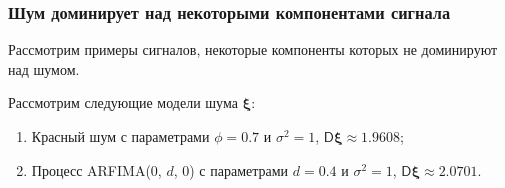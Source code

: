 \documentclass[specialist,
substylefile = spbu_report.rtx,
subf,12pt]{disser}
\theoremstyle{definition}
\begin{document}
\subsubsection{Шум доминирует над некоторыми компонентами сигнала}

Рассмотрим примеры сигналов, некоторые компоненты которых не доминируют над шумом.

Рассмотрим следующие модели шума $\bm\xi$:
\begin{enumerate}
	\item Красный шум с параметрами $\phi=0.7$ и $\sigma^2=1$, $\mathsf{D}\bm\xi\approx1.9608$;
	\item Процесс ARFIMA(0, $d$, 0) с параметрами $d=0.4$ и $\sigma^2=1$, $\mathsf{D}\bm\xi\approx2.0701$.
\end{enumerate}
\end{document}
